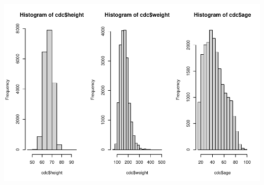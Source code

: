 \documentclass[
]{book}
\begin{document}
\includegraphics{_main_files/figure-latex/unnamed-chunk-147-1.pdf}
\end{document}
